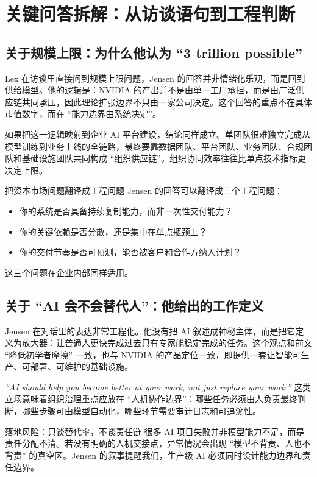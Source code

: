 \section{关键问答拆解：从访谈语句到工程判断}

\subsection{关于规模上限：为什么他认为 ``3 trillion possible''}

Lex 在访谈里直接问到规模上限问题，Jensen 的回答并非情绪化乐观，而是回到供给模型。他的逻辑是：NVIDIA 的产出并不是由单一工厂承担，而是由广泛供应链共同承压，因此理论扩张边界不只由一家公司决定。这个回答的重点不在具体市值数字，而在 ``能力边界由系统决定''。

如果把这一逻辑映射到企业 AI 平台建设，结论同样成立。单团队很难独立完成从模型训练到业务上线的全链路，最终要靠数据团队、平台团队、业务团队、合规团队和基础设施团队共同构成 ``组织供应链''。组织协同效率往往比单点技术指标更决定上限。

\begin{knowledgebox}{把资本市场问题翻译成工程问题}
Jensen 的回答可以翻译成三个工程问题：
\begin{itemize}
    \item 你的系统是否具备持续复制能力，而非一次性交付能力？
    \item 你的关键依赖是否分散，还是集中在单点瓶颈上？
    \item 你的交付节奏是否可预测，能否被客户和合作方纳入计划？
\end{itemize}
这三个问题在企业内部同样适用。
\end{knowledgebox}

\subsection{关于 ``AI 会不会替代人''：他给出的工作定义}

Jensen 在对话里的表达非常工程化。他没有把 AI 叙述成神秘主体，而是把它定义为放大器：让普通人更快完成过去只有专家能稳定完成的任务。这个观点和前文 ``降低初学者摩擦'' 一致，也与 NVIDIA 的产品定位一致，即提供一套让智能可生产、可部署、可维护的基础设施。

\textit{``AI should help you become better at your work, not just replace your work.''} 这类立场意味着组织治理重点应放在 ``人机协作边界''：哪些任务必须由人负责最终判断，哪些步骤可由模型自动化，哪些环节需要审计日志和可追溯性。

\begin{warningbox}{落地风险：只谈替代率，不谈责任链}
很多 AI 项目失败并非模型能力不足，而是责任分配不清。若没有明确的人机交接点，异常情况会出现 ``模型不背责、人也不背责'' 的真空区。Jensen 的叙事提醒我们，生产级 AI 必须同时设计能力边界和责任边界。
\end{warningbox}


